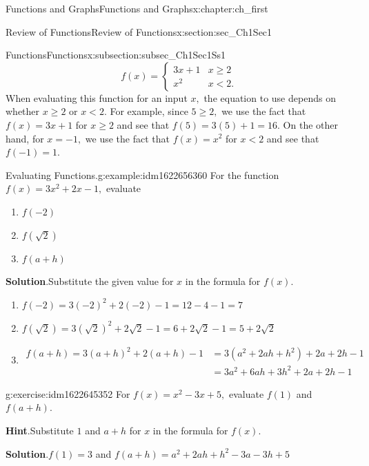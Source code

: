 \documentclass[oneside,10pt,]{book}
\newcommand{\blocktitlefont}{\relax}
\numberwithin{equation}{section}
\newcommand{\amp}{&}
\begin{document}
\begin{chapterptx}{Functions and Graphs}{}{Functions and Graphs}{}{}{x:chapter:ch_first}
\begin{sectionptx}{Review of Functions}{}{Review of Functions}{}{}{x:section:sec_Ch1Sec1}
\begin{subsectionptx}{Functions}{}{Functions}{}{}{x:subsection:subsec_Ch1Sec1Ss1}
%
\begin{equation*}
f(x)=\begin{cases} 3x+1 \amp x \geq 2 \\ x^2 \amp x < 2 .\end{cases}
\end{equation*}
When evaluating this function for an input \(x,\) the equation to use depends on whether \(x \geq 2\) or \(x < 2.\) For example, since \(5 \ge 2,\) we use the fact that \(f(x)=3x+1\) for \(x \geq 2\) and see that \(f(5)=3(5)+1=16.\) On the other hand, for \(x=-1,\) we use the fact that \(f(x)=x^2\) for \(x < 2\) and see that \(f(-1)=1.\)%
\begin{example}{Evaluating Functions.}{g:example:idm1622656360}%
For the function \(f(x)=3x^2+2x-1,\) evaluate%
%
\begin{enumerate}
\item{}\(\displaystyle f(-2)\)%
\item{}\(\displaystyle f(\sqrt{2})\)%
\item{}\(\displaystyle f(a+h)\)%
\end{enumerate}
\par\smallskip%
\noindent\textbf{\blocktitlefont Solution}.\hypertarget{g:solution:idm1622649576}{}\quad{}Substitute the given value for \(x \) in the formula for \(f(x).\)%
%
\begin{enumerate}
\item{}\(\displaystyle f(-2)=3(-2)^2+2(-2)-1=12-4-1=7\)%
\item{}\(\displaystyle f(\sqrt{2})=3(\sqrt{2})^2+2\sqrt{2}-1=6+2\sqrt{2}-1=5+2\sqrt{2}\)%
\item{}%
\begin{align*}
f(a+h)=3(a+h)^2+2(a+h)-1 \amp =3(a^2+2ah+h^2)+2a+2h-1\\
\amp =3a^2+6ah+3h^2+2a+2h-1
\end{align*}
%
\end{enumerate}
\end{example}
\begin{inlineexercise}{}{g:exercise:idm1622645352}%
For \(f(x)=x^2-3x+5,\) evaluate \(f(1)\) and \(f(a+h).\)%
\par\smallskip%
\noindent\textbf{\blocktitlefont Hint}.\hypertarget{g:hint:idm1622646888}{}\quad{}Substitute \(1\) and \(a+h\) for \(x\) in the formula for \(f(x).\)%
\par\smallskip%
\noindent\textbf{\blocktitlefont Solution}.\hypertarget{g:solution:idm1622644456}{}\quad{}\(f(1)=3\) and \(f(a+h)=a^2+2ah+h^2-3a-3h+5\)%
\end{inlineexercise}%

\end{subsectionptx}
\end{sectionptx}
\end{chapterptx}
\end{document}
